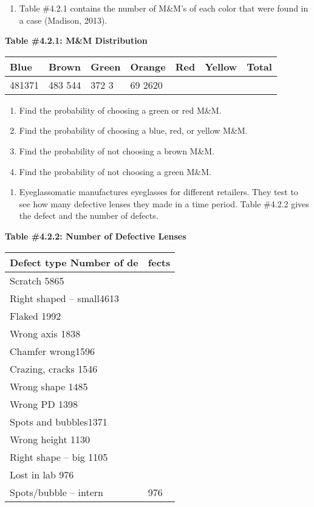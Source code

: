 \documentclass[]{book}
\providecommand{\tightlist}{%
  \setlength{\itemsep}{0pt}\setlength{\parskip}{0pt}}
\begin{document}
\begin{enumerate}
\def\labelenumi{\arabic{enumi}.}
\tightlist
\item
  Table \#4.2.1 contains the number of M\&M's of each color that were
  found in a case (Madison, 2013).
\end{enumerate}

\textbf{Table \#4.2.1: M\&M Distribution}

\begin{longtable}[]{@{}lllllll@{}}
\toprule
Blue & Brown & Green & Orange & Red & Yellow & Total\tabularnewline
\midrule
\endhead
481371 & 483 544 & 372 3 & 69 2620 & & &\tabularnewline
\bottomrule
\end{longtable}

\begin{enumerate}
\def\labelenumi{\alph{enumi}.}
\item
  Find the probability of choosing a green or red M\&M.
\item
  Find the probability of choosing a blue, red, or yellow M\&M.
\item
  Find the probability of not choosing a brown M\&M.
\item
  Find the probability of not choosing a green M\&M.
\end{enumerate}

\begin{enumerate}
\def\labelenumi{\arabic{enumi}.}
\setcounter{enumi}{1}
\tightlist
\item
  Eyeglassomatic manufactures eyeglasses for different retailers. They
  test to see how many defective lenses they made in a time period.
  Table \#4.2.2 gives the defect and the number of defects.
\end{enumerate}

\textbf{Table \#4.2.2: Number of Defective Lenses}

\begin{longtable}[]{@{}ll@{}}
\toprule
Defect type Number of de & fects\tabularnewline
\midrule
\endhead
Scratch 5865 &\tabularnewline
Right shaped -- small4613 &\tabularnewline
Flaked 1992 &\tabularnewline
Wrong axis 1838 &\tabularnewline
Chamfer wrong1596 &\tabularnewline
Crazing, cracks 1546 &\tabularnewline
Wrong shape 1485 &\tabularnewline
Wrong PD 1398 &\tabularnewline
Spots and bubbles1371 &\tabularnewline
Wrong height 1130 &\tabularnewline
Right shape -- big 1105 &\tabularnewline
Lost in lab 976 &\tabularnewline
Spots/bubble -- intern & 976\tabularnewline
\bottomrule
\end{longtable}
\end{document}
